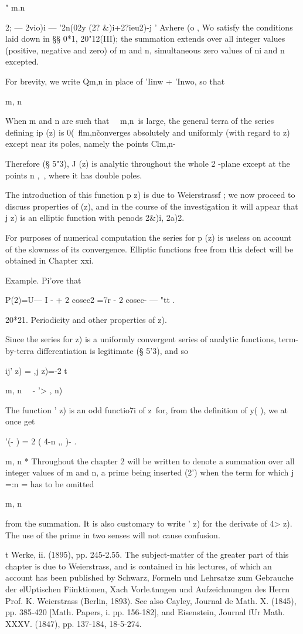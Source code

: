  " m.n \ \ {2; — 2vio)i — '2n(02y (2? \&)i+2?ieu2)-j ' Avhere (o , Wo
satisfy the conditions laid down in §§ 0*1, 20"12(III); the summation
extends over all integer values (positive, negative and zero) of m and
n, simultaneous zero values of ni and n excepted.

For brevity, we write Qm,n in place of 'Iinw + 'Inwo, so that

m, n

When m and n are such that \ \ m,n\ is large, the general terra of the
series defining ip (z) is 0(\ flm,n\~%
converges absolutely and uniformly (with regard to z) except near its
poles, namely the points Clm,n-

Therefore (§ 5"3), J (z) is analytic throughout the whole 2 -plane
except at the points n ,\ , where it has double poles.

The introduction of this function p z) is due to Weierstrassf ; we now
proceed to discuss properties of (z), and in the course of the
investigation it will appear that j z) is an elliptic function with
penods 2\&)i, 2a)2.

For purposes of numerical computation the series for p (z) is useless
on account of the slowness of its convergence. Elliptic functions free
from this defect will be obtained in Chapter xxi.

Example. Pi'ove that

P(2)=U— I - + 2 cosec2 =7r - 2 cosec- — "tt .

20*21. Periodicity and other properties of z).

Since the series for z) is a uniformly convergent series of analytic
functions, term-by-terra differentiation is legitimate (§ 5'3), and so

ij' z) = ,j z)=-2 t

  m, n \ \ - '> , n)

The function ' z) is an odd functio7i of z\ for, from the definition
of y( ), we at once get

 '(- ) = 2 ( 4-n ,, )- .

m, n * Throughout the chapter 2 will be written to denote a summation
over all integer values of m and n, a prime being inserted (2') when
the term for which j =:n = has to be omitted

m, n

from the summation. It is also customary to write ' z) for the
derivate of 4> z). The use of the prime in two senses will not cause
confusion.

t Werke, ii. (1895), pp. 245-2.55. The subject-matter of the greater
part of this chapter is due to Weierstrass, and is contained in his
lectures, of which an account has been published by Schwarz, Formeln
und Lehrsatze zum Gebrauche der elUptischen Fiinktionen, Xach
Vorle.tnngen und Aufzeichnungen des Herrn Prof. K. Weierstrass
(Berlin, 1893). See also Cayley, Journal de Math. X. (1845), pp.
385-420 [Math. Papers, i. pp. 156-182], and Eisenstein, Journal fUr
Math. XXXV. (1847), pp. 137-184, 18-5-274.

}
